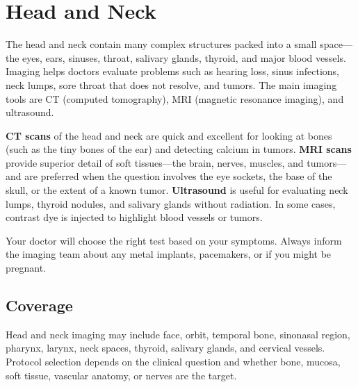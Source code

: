 \chapter{Head and Neck}

\label{ch:ch39_head_neck}

The head and neck contain many complex structures packed into a small space---the eyes, ears, sinuses, throat, salivary glands, thyroid, and major blood vessels. Imaging helps doctors evaluate problems such as hearing loss, sinus infections, neck lumps, sore throat that does not resolve, and tumors. The main imaging tools are CT (computed tomography), MRI (magnetic resonance imaging), and ultrasound.

\textbf{CT scans} of the head and neck are quick and excellent for looking at bones (such as the tiny bones of the ear) and detecting calcium in tumors. \textbf{MRI scans} provide superior detail of soft tissues---the brain, nerves, muscles, and tumors---and are preferred when the question involves the eye sockets, the base of the skull, or the extent of a known tumor. \textbf{Ultrasound} is useful for evaluating neck lumps, thyroid nodules, and salivary glands without radiation. In some cases, contrast dye is injected to highlight blood vessels or tumors.

Your doctor will choose the right test based on your symptoms. Always inform the imaging team about any metal implants, pacemakers, or if you might be pregnant.


\section{Coverage}
Head and neck imaging may include face, orbit, temporal bone, sinonasal region, pharynx, larynx, neck spaces, thyroid, salivary glands, and cervical vessels. Protocol selection depends on the clinical question and whether bone, mucosa, soft tissue, vascular anatomy, or nerves are the target.


